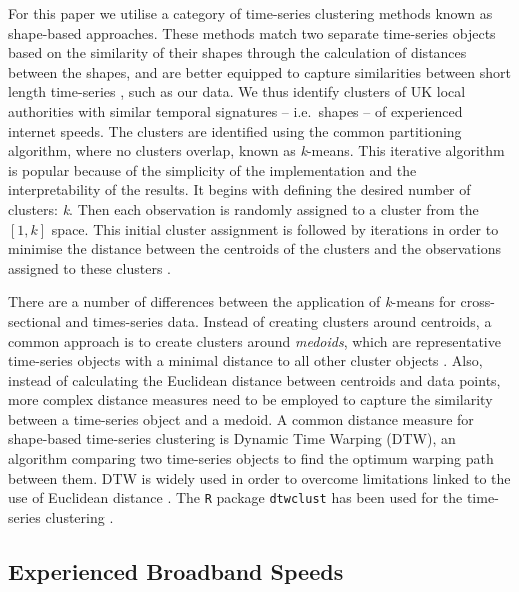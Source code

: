 \documentclass[]{interact}
\theoremstyle{plain}%
\theoremstyle{definition}
\theoremstyle{remark}
\begin{document}
For this paper we utilise a category of time-series clustering methods
known as shape-based approaches. These methods match two separate
time-series objects based on the similarity of their shapes through the
calculation of distances between the shapes, and are better equipped to
capture similarities between short length time-series
\citep{aghabozorgi2015time}, such as our data. We thus identify clusters
of UK local authorities with similar temporal signatures -- i.e.~shapes
-- of experienced internet speeds. The clusters are identified using the
common partitioning algorithm, where no clusters overlap, known as
\emph{k}-means. This iterative algorithm is popular because of the
simplicity of the implementation and the interpretability of the
results. It begins with defining the desired number of clusters:
\emph{k}. Then each observation is randomly assigned to a cluster from
the \([1,k]\) space. This initial cluster assignment is followed by
iterations in order to minimise the distance between the centroids of
the clusters and the observations assigned to these clusters
\citep{james2013introduction}.

There are a number of differences between the application of
\emph{k}-means for cross-sectional and times-series data. Instead of
creating clusters around centroids, a common approach is to create
clusters around \emph{medoids}, which are representative time-series
objects with a minimal distance to all other cluster objects
\citep{sardatime}. Also, instead of calculating the Euclidean distance
between centroids and data points, more complex distance measures need
to be employed to capture the similarity between a time-series object
and a medoid. A common distance measure for shape-based time-series
clustering is Dynamic Time Warping (DTW), an algorithm comparing two
time-series objects to find the optimum warping path between them. DTW
is widely used in order to overcome limitations linked to the use of
Euclidean distance
\citep{sardatime, berndt1994using, ratanamahatana2004everything}. The
\texttt{R} package \texttt{dtwclust} has been used for the time-series
clustering \citep{dtwclust}.

\hypertarget{sec:3.2}{%
\subsection{Experienced Broadband Speeds}\label{sec:3.2}}
\end{document}
